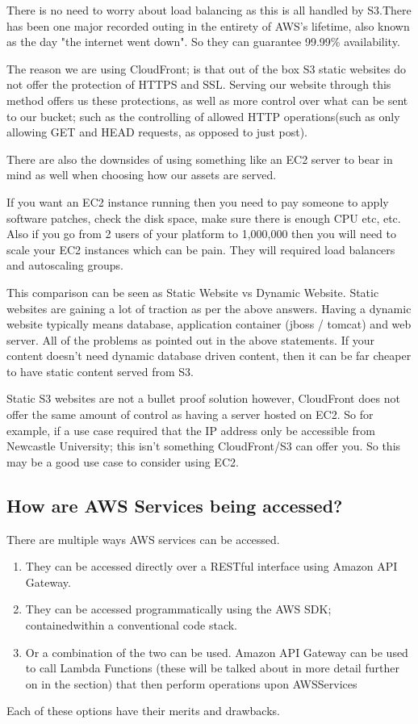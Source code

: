 \documentclass[runningheads]{llncs}
\begin{document}
There is no need to worry about load balancing as this is all handled by S3.There has been one major recorded outing in the entirety of AWS's lifetime, also known as the day "the internet went down". So they can guarantee 99.99\% availability.

The reason we are using CloudFront; is that out of the box S3 static websites do not offer the protection of HTTPS and SSL. Serving our website through this method offers us these protections, as well as more control over what can be sent to our bucket; such as the controlling of allowed HTTP operations(such as only allowing GET and HEAD requests, as opposed to just post).

There are also the downsides of using something like an EC2 server to bear in mind as well when choosing how our assets are served.

If you want an EC2 instance running then you need to pay someone to apply software patches, check the disk space, make sure there is enough CPU etc, etc. Also if you go from 2 users of your platform to 1,000,000 then you will need to scale your EC2 instances which can be pain.  They will required load balancers and autoscaling groups.

This comparison can be seen as Static Website vs Dynamic Website. Static websites are gaining a lot of traction as per the above answers.  Having a dynamic website typically means database, application container (jboss / tomcat) and web server. All of the problems as pointed out in the above statements. If your content doesn't need dynamic database driven content, then it can be far cheaper to have static content served from S3.

Static S3 websites are not a bullet proof solution however, CloudFront does not offer the same amount of control as having a server hosted on EC2. So for example, if a use case required that the IP address only be accessible from Newcastle University; this isn't something CloudFront/S3 can offer you. So this may be a good use case to consider using EC2.

\subsection{How are AWS Services being accessed?}
There are multiple ways AWS services can be accessed.
\begin{enumerate}
	\item They can be accessed directly over a RESTful interface using Amazon API Gateway.
	\item They can be accessed programmatically using the AWS SDK; containedwithin a conventional code stack.
	\item Or a combination of the two can be used. Amazon API Gateway can be used to call Lambda Functions (these will be talked about in more detail further on in the section) that then perform operations upon AWSServices
\end{enumerate}
Each of these options have their merits and drawbacks.
\end{document}
